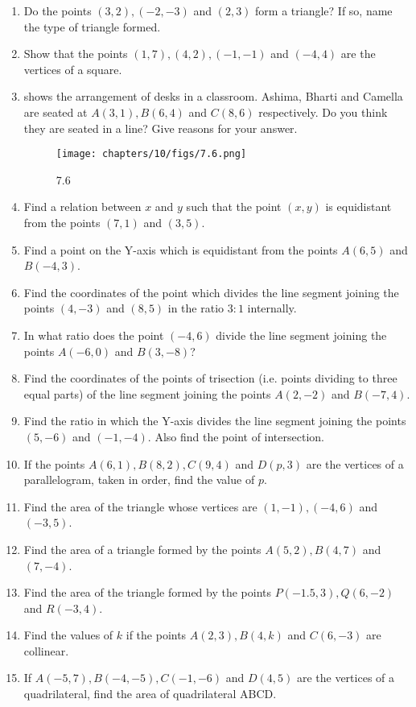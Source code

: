\begin{enumerate}
\item Do the points $(3,2), (-2,-3)$ and $(2,3)$ form a triangle? If so, name the type of triangle formed.
\item Show that the points $(1,7),(4,2),(-1,-1)$ and $(-4,4)$ are the vertices of a square.
\item {} shows the arrangement of desks in a classroom. Ashima, Bharti and Camella are seated at $A(3,1),B(6,4)$ and $C(8,6)$ respectively. Do you think they are seated in a line? Give reasons for your answer.
\begin{figure}[h]
\centering 
\texttt{[image: chapters/10/figs/7.6.png]}
\caption{7.6}
\label{fig:7.6}
\end{figure}
\item Find a relation between $x$ and $y$ such that the point $(x,y)$ is equidistant from the points $(7,1)$ and $(3,5)$.
\item Find a point on the Y-axis which is equidistant from the points $A(6,5)$ and $B(-4,3)$.
\item Find the coordinates of the point which divides the line segment joining the points $(4,-3)$ and $(8,5)$ in the ratio $3:1$ internally.
\item In what ratio does the point $(-4,6)$ divide the line segment joining the points $A(-6,0)$ and $B(3,-8)$?
\item Find the coordinates of the points of trisection (i.e. points dividing to three equal parts) of the line segment joining the points $A(2,-2)$ and $B(-7,4)$.
\item Find the ratio in which the Y-axis divides the line segment joining the points $(5,-6)$ and $(-1,-4)$. Also find the point of intersection.
\item If the points $A(6,1),B(8,2), C(9,4)$ and $D(p,3)$ are the vertices of a parallelogram, taken in order, find the value of $p$.
\item Find the area of the triangle whose vertices are $(1,-1), (-4,6)$ and $(-3,5)$.
\item Find the area of a triangle formed by the points $A(5,2), B(4,7)$ and $(7,-4)$.
\item Find the area of the triangle formed by the points $P(-1.5,3), Q(6,-2)$ and $R(-3,4)$.
\item Find the values of $k$ if the points $A(2,3), B(4,k)$ and $C(6,-3)$ are collinear.
\item If $A(-5,7), B(-4,-5), C(-1,-6)$ and $D(4,5)$ are the vertices of a quadrilateral, find the area of quadrilateral ABCD.
\end{enumerate}
 

